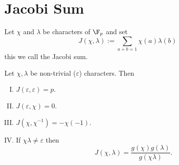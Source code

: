 \section{Jacobi Sum}

\begin{definition}
    Let \(\chi\) and \(\lambda\) be characters of \(\F_p\) and set \[J(\chi,
        \lambda) := \sum_{a + b = 1} \chi(a)\lambda(b)\] this we call the Jacobi
    sum.
\end{definition}

\begin{theorem}
    Let \(\chi, \lambda\) be non-trivial (\(\varepsilon\)) characters. Then
    \begin{enumerate}[I.]
        \item \(J(\varepsilon, \varepsilon) = p\).
        \item \(J(\varepsilon, \chi) = 0\).
        \item \(J(\chi, \chi^{-1}) = - \chi(-1)\).
        \item If  \(\chi\lambda \neq \varepsilon\) then
              \[
                  J(\chi, \lambda) = \frac{g(\chi)g(\lambda)}{g(\chi\lambda)}.
              \]
    \end{enumerate}
\end{theorem}

